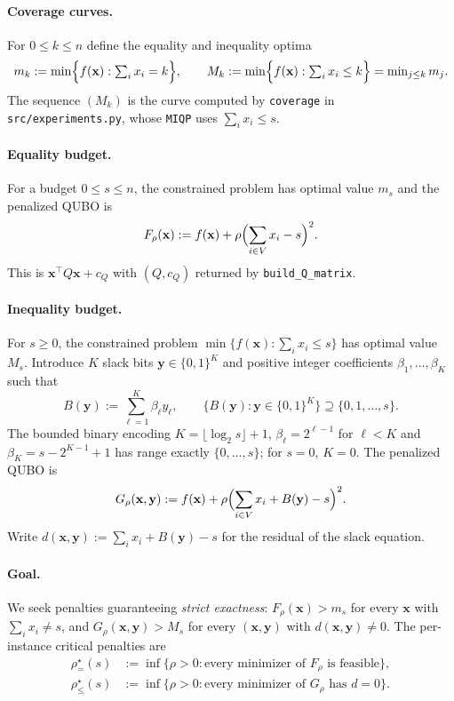 \documentclass[11pt]{article}
\newcommand{\x}{\mathbf{x}}
\newcommand{\y}{\mathbf{y}}
\newcommand{\rseq}{\rho^\star_{=}}
\newcommand{\rsle}{\rho^\star_{\le}}
\begin{document}
\paragraph{Coverage curves.}
For $0\le k\le n$ define the equality and inequality optima
\begin{equation}
m_k:=\min\Bigl\{f(\x):\textstyle\sum_i x_i=k\Bigr\},
\qquad
M_k:=\min\Bigl\{f(\x):\textstyle\sum_i x_i\le k\Bigr\}=\min_{j\le k}m_j .
\label{eq:coverage}
\end{equation}
The sequence $(M_k)$ is the curve computed by \texttt{coverage} in
\texttt{src/experiments.py}, whose \texttt{MIQP} uses $\sum_ix_i\le s$.

\paragraph{Equality budget.}
For a budget $0\le s\le n$, the constrained problem has optimal value $m_s$ and
the penalized QUBO is
\begin{equation}
F_\rho(\x):=f(\x)+\rho\Bigl(\sum_{i\in V}x_i-s\Bigr)^2 .
\label{eq:Feq}
\end{equation}
This is $\x^\top Q\x+c_Q$ with $(Q,c_Q)$ returned by \texttt{build\_Q\_matrix}.

\paragraph{Inequality budget.}
For $s\ge0$, the constrained problem $\min\{f(\x):\sum_ix_i\le s\}$ has optimal
value $M_s$. Introduce $K$ slack bits $\y\in\{0,1\}^K$ and positive integer
coefficients $\beta_1,\dots,\beta_K$ such that
\begin{equation}
B(\y):=\sum_{\ell=1}^K\beta_\ell y_\ell,
\qquad
\{B(\y):\y\in\{0,1\}^K\}\supseteq\{0,1,\dots,s\}.
\label{eq:slack}
\end{equation}
The bounded binary encoding $K=\lfloor\log_2 s\rfloor+1$,
$\beta_\ell=2^{\ell-1}$ for $\ell<K$ and $\beta_K=s-2^{K-1}+1$ has range exactly
$\{0,\dots,s\}$; for $s=0$, $K=0$. The penalized QUBO is
\begin{equation}
G_\rho(\x,\y):=f(\x)+\rho\Bigl(\sum_{i\in V}x_i+B(\y)-s\Bigr)^2 .
\label{eq:Gle}
\end{equation}
Write $d(\x,\y):=\sum_ix_i+B(\y)-s$ for the residual of the slack equation.

\paragraph{Goal.}
We seek penalties guaranteeing \emph{strict exactness}: $F_\rho(\x)>m_s$ for
every $\x$ with $\sum_ix_i\neq s$, and $G_\rho(\x,\y)>M_s$ for every $(\x,\y)$
with $d(\x,\y)\neq0$. The per-instance critical penalties are
\begin{align}
\rseq(s)&:=\inf\{\rho>0:\text{every minimizer of }F_\rho\text{ is feasible}\},
\label{eq:rhostar-def}\\
\rsle(s)&:=\inf\{\rho>0:\text{every minimizer of }G_\rho\text{ has }d=0\}.
\nonumber
\end{align}
\end{document}
